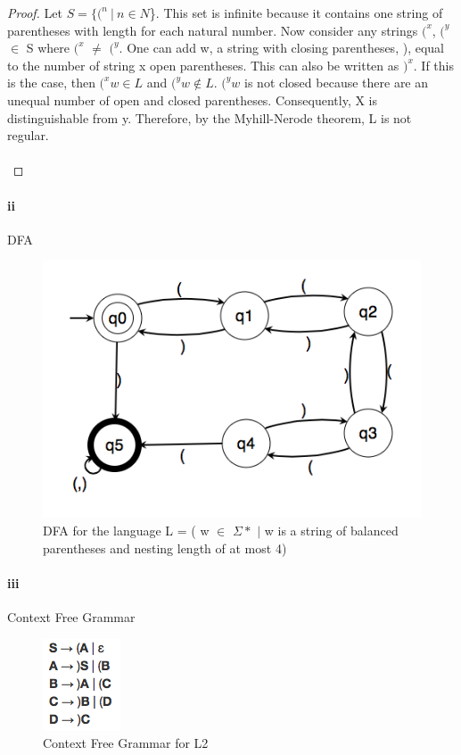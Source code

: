 \documentclass[10pt,letter]{article}
\begin{document}
\begin{proof}
Let $S = \{ (^n\ |\ n \in N$\}. This set is infinite because it contains one string of parentheses with length for each natural number. Now consider any strings $(^x$, $(^y$ $\in$ S where $(^x$ $\neq$ $(^y.$  One can add w, a  string with closing parentheses, ),  equal to the number of string x open parentheses. This can also be written as $)^x$. If this is the case, then  $(^xw \in L$ and $(^yw \notin L.$  $(^yw$ is not closed because there are an unequal number of open and closed parentheses. Consequently, X is distinguishable from y. Therefore, by the Myhill-Nerode theorem, L is not regular. \\ \\
\end{proof}

\paragraph{ii} DFA 

\begin{figure}[h]
    \centering
    \includegraphics[width=0.4\linewidth]{p2ii}
    \caption{DFA for the language L = ( w $\in$ $\Sigma*$ $\mid$ w is a string of balanced parentheses and nesting length of at most 4)}
    \label{fig:q1i}
\end{figure}

\paragraph{iii} Context Free Grammar \\
\begin{figure}[h]
    \centering
    \includegraphics[width=0.15\linewidth]{p2iii}
    \caption{Context Free Grammar for L2}
    \label{fig:q1i}
\end{figure}
\end{document}
